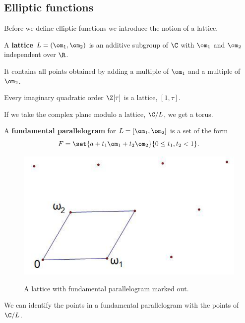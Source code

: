 

\subsection{Elliptic functions}\label{sec:ell-f}
Before we define elliptic functions we introduce the notion of a lattice.
\begin{df}\label{df:lattice}
A \textbf{lattice} $L=(\om_1,\om_2)$ is an additive subgroup of $\C$ with $\om_1$ and $\om_2$ independent over $\R$. 
\end{df}
It contains all points obtained by adding a multiple of $\om_1$ and a multiple of $\om_2$.

\begin{ex}
Every imaginary quadratic order $\Z[\tau]$ is a lattice, $[1,\tau]$. 
\end{ex}
If we take the complex plane modulo a lattice, $\C/L$, we get a torus. 
\begin{df}
A \textbf{fundamental parallelogram} for $L=[\om_1,\om_2]$ is a set of the form
\[
F=\set{a+t_1\om_1+t_2\om_2}{0\le t_1,t_2<1}.
\]
\end{df}
\begin{figure}[h!] 
\centering
\includegraphics[scale=0.75]{ag-chapters/lattice2}\\
\caption{A lattice with fundamental parallelogram marked out.}
\end{figure}

We can identify the points in a fundamental parallelogram with the points of $\C/L$.

